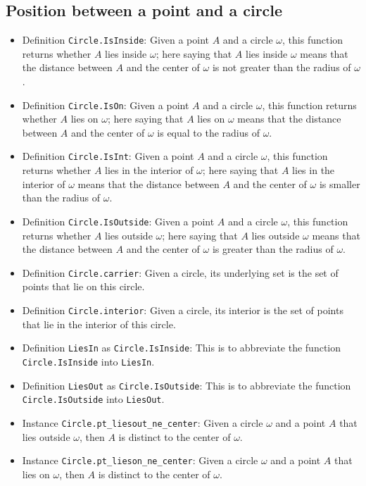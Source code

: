 \documentclass[12pt]{amsart}
\begin{document}
\subsection{Position between a point and a circle}
\begin{itemize}
    \item Definition \verb|Circle.IsInside|: Given a point $A$ and a circle $\omega$, this function returns whether $A$ lies inside $\omega$; here saying that $A$ lies inside $\omega$ means that the distance between $A$ and the center of $\omega$ is not greater than the radius of $\omega$.
    \item Definition \verb|Circle.IsOn|: Given a point $A$ and a circle $\omega$, this function returns whether $A$ lies on $\omega$; here saying that $A$ lies on $\omega$ means that the distance between $A$ and the center of $\omega$ is equal to the radius of $\omega$.
    \item Definition \verb|Circle.IsInt|: Given a point $A$ and a circle $\omega$, this function returns whether $A$ lies in the interior of $\omega$; here saying that $A$ lies in the interior of $\omega$ means that the distance between $A$ and the center of $\omega$ is smaller than the radius of $\omega$.
    \item Definition \verb|Circle.IsOutside|: Given a point $A$ and a circle $\omega$, this function returns whether $A$ lies outside $\omega$; here saying that $A$ lies outside $\omega$ means that the distance between $A$ and the center of $\omega$ is greater than the radius of $\omega$.
    \item Definition \verb|Circle.carrier|: Given a circle, its underlying set is the set of points that lie on this circle.
    \item Definition \verb|Circle.interior|: Given a circle, its interior is the set of points that lie in the interior of this circle.
    \item Definition \verb|LiesIn| as \verb|Circle.IsInside|: This is to abbreviate the function \verb|Circle.IsInside| into \verb|LiesIn|.
    \item Definition \verb|LiesOut| as \verb|Circle.IsOutside|: This is to abbreviate the function \verb|Circle.IsOutside| into \verb|LiesOut|.
    \item Instance \verb|Circle.pt_liesout_ne_center|: Given a circle $\omega$ and a point $A$ that lies outside $\omega$, then $A$ is distinct to the center of $\omega$.
    \item Instance \verb|Circle.pt_lieson_ne_center|: Given a circle $\omega$ and a point $A$ that lies on $\omega$, then $A$ is distinct to the center of $\omega$.

\end{itemize}
\end{document}
